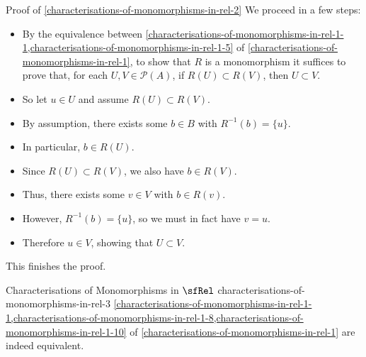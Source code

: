 \begin{Proof}{Proof of \cref{characterisations-of-monomorphisms-in-rel-2}}
    We proceed in a few steps:
    \begin{itemize}
        \item By the equivalence between \cref{characterisations-of-monomorphisms-in-rel-1-1,characterisations-of-monomorphisms-in-rel-1-5} of \cref{characterisations-of-monomorphisms-in-rel-1}, to show that $R$ is a monomorphism it suffices to prove that, for each $U,V\in\mathcal{P}(A)$, if $R(U)\subset R(V)$, then $U\subset V$.
        \item So let $u\in U$ and assume $R(U)\subset R(V)$.
        \item By assumption, there exists some $b\in B$ with $R^{-1}(b)=\{u\}$.
        \item In particular, $b\in R(U)$.
        \item Since $R(U)\subset R(V)$, we also have $b\in R(V)$.
        \item Thus, there exists some $v\in V$ with $b\in R(v)$.
        \item However, $R^{-1}(b)=\{u\}$, so we must in fact have $v=u$.
        \item Therefore $u\in V$, showing that $U\subset V$.
    \end{itemize}
    This finishes the proof.
\end{Proof}
\begin{corollary}{Characterisations of Monomorphisms in $\sfRel$ \rmIII}{characterisations-of-monomorphisms-in-rel-3}%
    \cref{characterisations-of-monomorphisms-in-rel-1-1,characterisations-of-monomorphisms-in-rel-1-8,characterisations-of-monomorphisms-in-rel-1-10} of \cref{characterisations-of-monomorphisms-in-rel-1} are indeed equivalent.%
\end{corollary}
